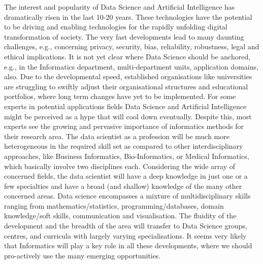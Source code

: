 The interest and popularity of Data Science and Artificial Intelligence has dramatically risen in the last 10-20 years. These technologies have the potential to be driving and enabling technologies for the rapidly unfolding digital transformation of society. The very fast developments lead to many daunting challenges, e.g., concerning privacy, security, bias, reliability, robustness, legal and ethical implications. It is not yet clear where Data Science should be anchored, e.g., in the Informatics department, multi-department units, application domains, also. Due to the developmental speed, established organisations like universities are struggling to swiftly adjust their organisational structures and educational portfolios, where long term changes have yet to be implemented. For some experts in potential applications fields Data Science and Artificial Intelligence might be perceived as a hype that will cool down eventually. Despite this, most experts see the growing and pervasive importance of informatics methods for their research area. The data scientist as a profession will be much more heterogeneous in the required skill set as compared to other interdisciplinary approaches, like Business Informatics, Bio-Informatics, or Medical Informatics, which basically involve two disciplines each. Considering the wide array of concerned fields, the data scientist will have a deep knowledge in just one or a few specialties and have a broad (and shallow) knowledge of the many other concerned areas. Data science encompasses a mixture of multidisciplinary skills ranging from mathematics/statistics, programming/databases, domain knowledge/soft skills, communication and visualisation. The fluidity of the development and the breadth of the area will transfer to Data Science groups, centres, and curricula with largely varying specialisations. It seems very likely that Informatics will play a key role in all these developments, where we should pro-actively use the many emerging opportunities.
